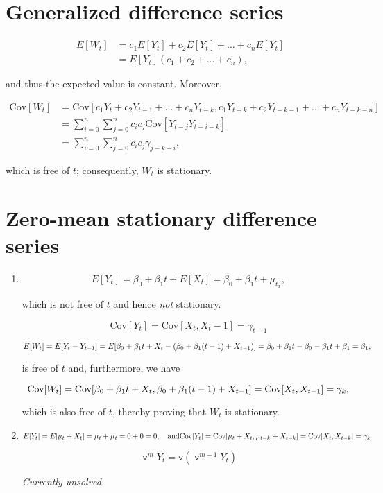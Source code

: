 \documentclass[]{book}
\begin{document}
\section{Generalized difference
series}\label{generalized-difference-series}

\begin{align}
  E[W_t] & = c_1E[Y_t]+c_2E[Y_t] + \dots + c_n E[Y_t]\\
         & = E[Y_t](c_1 + c_2 + \dots + c_n),
\end{align}

and thus the expected value is constant. Moreover,

\begin{align}
  \text{Cov}[W_t] & = \text{Cov}[c_1 Y_t + c_2 Y_{t-1} + \dots + c_n Y_{t-k}, c_1 Y_{t-k} + c_2 Y_{t-k-1} + \dots + c_n Y_{t-k-n}] \\
                  & = \sum_{i=0}^n \sum_{j=0}^n c_i c_j \text{Cov}[Y_{t-j}Y_{t-i-k}] \\
                  & = \sum_{i=0}^n \sum_{j=0}^n c_i c_j \gamma_{j-k-i},
\end{align}

which is free of \(t\); consequently, \(W_t\) is stationary.

\section{Zero-mean stationary difference
series}\label{zero-mean-stationary-difference-series}

\begin{enumerate}
\def\labelenumi{(\alph{enumi})}
\item
  \[
    E[Y_t] = \beta_0 + \beta_1 t + E[X_t] = \beta_0 + \beta_1 t + \mu_{t_x},
  \]

  which is not free of \(t\) and hence \emph{not} stationary.

  \[
    \text{Cov}[Y_t] = \text{Cov}[X_t, X_t-1] = \gamma_{t-1}
  \]

  \[
    E[W_t] = E[Y_t - Y_{t-1}] = E[\beta_0 + \beta_1 t + X_t - (\beta_0 + \beta_1(t-1) + X_{t-1})] =\\
    \beta_0 + \beta_1 t - \beta_0 - \beta_1 t + \beta_1  = \beta_1,
  \]

  is free of \(t\) and, furthermore, we have

  \[
    \text{Cov}[W_t] = \text{Cov}[\beta_0 + \beta_1 t + X_t, \beta_0 + \beta_1 (t-1) + X_{t-1}] =\\
    \text{Cov}[X_t, X_{t-1}] = \gamma_k,  
  \]

  which is also free of \(t\), thereby proving that \(W_t\) is
  stationary.
\item
  \[
    E[Y_t] = E[\mu_t + X_t] = \mu_t + \mu_t = 0 + 0 = 0, \quad \text{and}\\
    \text{Cov}[Y_t] = \text{Cov}[\mu_t + X_t, \mu_{t-k} + X_{t-k}] = \text{Cov}[X_t, X_{t-k}] = \gamma_k
  \]

  \[
    \triangledown^m Y_t = \triangledown(\triangledown^{m−1}Y_t)
  \]

  \emph{Currently unsolved.}
\end{enumerate}
\end{document}
